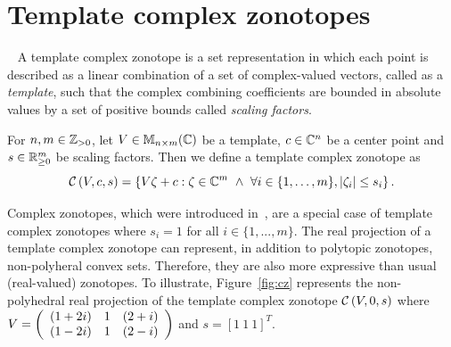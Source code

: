 \section{Template complex zonotopes}~\label{sec:tcz}
A template complex zonotope is a set representation in which each point
is described as a linear combination of a set of complex-valued vectors,
called as a \textit{template}, such that the complex combining coefficients are
bounded in absolute values by a set of positive bounds called
\textit{scaling factors}.
%
\begin{defn}
  For $n,m\in\mathbb{Z}_{> 0}$, let $V\in\mathbb{M}_{n\times m}(\mathbb{C})$ be a template, $c\in\mathbb{C}^n$
  be a center point and $s\in{{\mathbb{R}}}^m_{\geq 0}$ be scaling factors.  Then we
  define a template complex zonotope as 
  \[\mathcal{C}\left(V,c,s\right)=\left\{V\zeta+c:\zeta\in\mathbb{C}^m~\wedge~\forall
  i\in\{1,\ldots,m\},|\zeta_i|\leq s_i\right\}.\]
\end{defn}
%
Complex zonotopes, which were introduced in~\cite{arvind2016lis}, are
a special case of template complex zonotopes where $s_i = 1$ for all
$i\in\{1,...,m\}$.  The real projection of a template complex zonotope
can represent, in addition to polytopic zonotopes, non-polyheral
convex sets.  Therefore, they are also more expressive than usual
(real-valued) zonotopes.  To illustrate, Figure~\ref{fig:cz}
represents the non-polyhedral real projection of the template complex
zonotope $\mathcal{C}\left(V,0,s\right)$ where $V=\left(\begin{array}{lll}(1+2i) & 1 &
  (2+i)\\(1-2i) & 1 & (2-i)\end{array}\right)$ and $s=[1~1~1]^T$.
%
